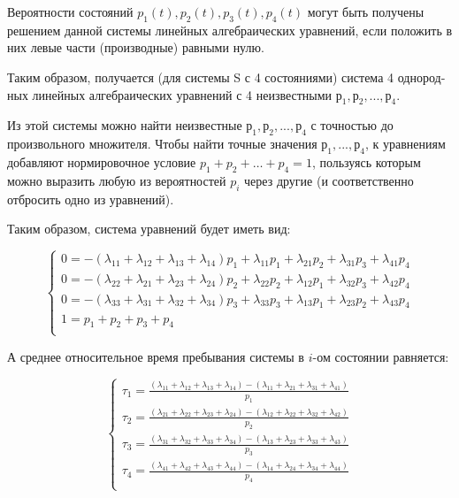 \documentclass[a4paper,12pt]{article}
\begin{document}
	
	Вероятности состояний $p_1(t), p_2(t), p_3(t), p_4(t)$ могут быть получены решением данной системы линейных алгебраических уравнений, если по­ложить в них левые части (производные) равными нулю.
	
	Таким образом, получается (для системы S с 4 состояниями) система 4 однород­ных линейных алгебраических уравнений с 4 неизвест­ными $р_1, р_2, ..., р_4$.
	
	 
	Из этой системы можно найти неизвестные $р_1, р_2, ..., р_4$ с точностью до произвольного множителя. Чтобы найти точные значения $р_1,..., р_4$, к уравнениям добавляют нормировочное условие $p_1 + p_2+ …+ p_4 =1$, пользуясь которым можно выразить любую из ве­роятностей $p_i$ через другие (и соответственно отбросить одно из уравне­ний).

	Таким образом, система уравнений будет иметь вид:
	
	\begin{equation}
	\begin{cases}
	0 = -(\lambda_{11} + \lambda_{12} + \lambda_{13} + \lambda_{14}) p_1 + \lambda_{11} p_1 + \lambda_{21} p_2 + \lambda_{31} p_3 + \lambda_{41} p_4\\
	0 = -(\lambda_{22} + \lambda_{21} + \lambda_{23} + \lambda_{24}) p_2 + \lambda_{22} p_2 + \lambda_{12} p_1 + \lambda_{32} p_3 + \lambda_{42} p_4\\
	0 = -(\lambda_{33} + \lambda_{31} + \lambda_{32} + \lambda_{34}) p_3 + \lambda_{33} p_3 + \lambda_{13} p_1 + \lambda_{23} p_2 + \lambda_{43} p_4\\
	1 = p_1 + p_2 + p_3 + p_4\\
	\end{cases}
	\end{equation}
	
	А среднее относительное время пребывания системы в $i$-ом состоянии равняется:
	
	\begin{equation}
	\begin{cases}
	\tau_1 = \frac{(\lambda_{11} + \lambda_{12} + \lambda_{13} + \lambda_{14}) - (\lambda_{11} + \lambda_{21} + \lambda_{31} + \lambda_{41})}{p_1}\\
	\tau_2 = \frac{(\lambda_{21} + \lambda_{22} + \lambda_{23} + \lambda_{24}) - (\lambda_{12} + \lambda_{22} + \lambda_{32} + \lambda_{42})}{p_2}\\
	\tau_3 = \frac{(\lambda_{31} + \lambda_{32} + \lambda_{33} + \lambda_{34}) - (\lambda_{13} + \lambda_{23} + \lambda_{33} + \lambda_{43})}{p_3}\\
	\tau_4 = \frac{(\lambda_{41} + \lambda_{42} + \lambda_{43} + \lambda_{44}) - (\lambda_{14} + \lambda_{24} + \lambda_{34} + \lambda_{44})}{p_4}\\
	\end{cases}
	\end{equation}
	
\end{document}
